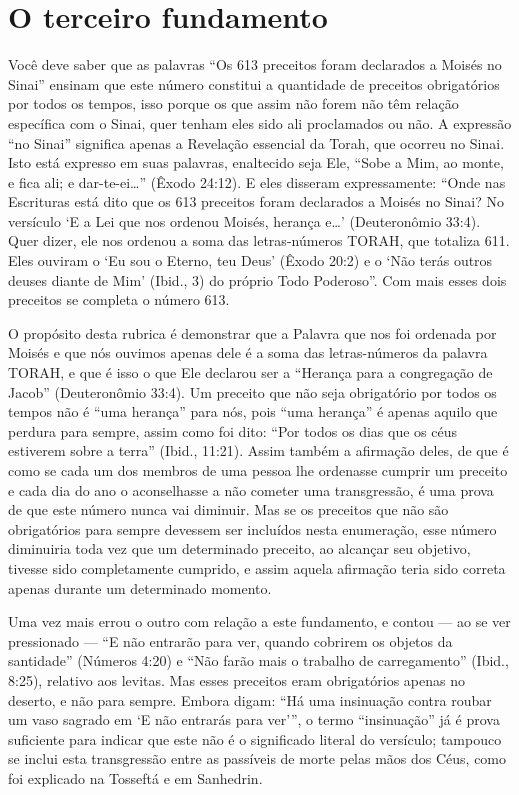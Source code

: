 \chapter*{O terceiro fundamento}

Você deve saber que as palavras ``Os 613 preceitos foram declarados a
Moisés no Sinai'' ensinam que este número constitui a quantidade de
preceitos obrigatórios por todos os tempos, isso porque os que assim não
forem não têm relação específica com o Sinai, quer tenham eles sido ali
proclamados ou não. A expressão ``no Sinai'' significa apenas a
Revelação essencial da Torah, que ocorreu no Sinai. Isto está expresso
em suas palavras, enaltecido seja Ele, ``Sobe a Mim, ao monte, e fica
ali; e dar-te-ei\ldots{}'' (Êxodo 24:12). E eles disseram expressamente:
``Onde nas Escrituras está dito que os 613 preceitos foram declarados a
Moisés no Sinai? No versículo `E a Lei que nos ordenou Moisés, herança
e\ldots{}' (Deuteronômio 33:4). Quer dizer, ele nos ordenou a soma das
letras-números TORAH, que totaliza 611. Eles ouviram o `Eu sou o
Eterno, teu Deus' (Êxodo 20:2) e o `Não terás outros deuses diante de
Mim' (Ibid., 3) do próprio Todo Poderoso''. Com mais esses dois
preceitos se completa o número 613.

O propósito desta rubrica é demonstrar que a Palavra que nos foi
ordenada por Moisés e que nós ouvimos apenas dele é a soma das
letras-números da palavra TORAH, e que é isso o que Ele declarou ser a
``Herança para a congregação de Jacob'' (Deuteronômio 33:4). Um preceito
que não seja obrigatório por todos os tempos não é ``uma herança'' para
nós, pois ``uma herança'' é apenas aquilo que perdura para sempre,
assim como foi dito: ``Por todos os dias que os céus estiverem sobre a
terra'' (Ibid., 11:21). Assim também a afirmação deles, de que é como
se cada um dos membros de uma pessoa lhe ordenasse cumprir um preceito
e cada dia do ano o aconselhasse a não cometer uma transgressão, é uma
prova de que este número nunca vai diminuir. Mas se os preceitos que não
são obrigatórios para sempre devessem ser incluídos nesta enumeração,
esse número diminuiria toda vez que um determinado preceito, ao alcançar
seu objetivo, tivesse sido completamente cumprido, e assim aquela
afirmação teria sido correta apenas durante um determinado momento.

Uma vez mais errou o outro com relação a este fundamento, e contou ---
ao se ver pressionado --- ``E não entrarão para ver, quando cobrirem os
objetos da santidade'' (Números 4:20) e ``Não farão mais o trabalho de
carregamento'' (Ibid., 8:25), relativo aos levitas. Mas esses preceitos
eram obrigatórios apenas no deserto, e não para sempre. Embora digam:
``Há uma insinuação contra roubar um vaso sagrado em `E não entrarás
para ver''', o termo ``insinuação'' já é prova suficiente para indicar
que este não é o significado literal do versículo; tampouco se inclui
esta transgressão entre as passíveis de morte pelas mãos dos Céus, como
foi explicado na Tosseftá e em Sanhedrin.

